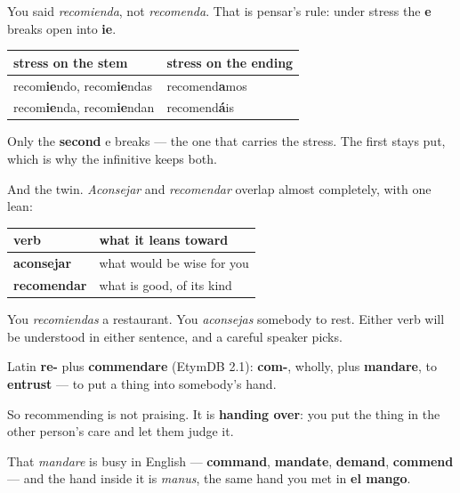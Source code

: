 \begin{grammarlens}[title={Grammar Lens: the e that breaks, and the twin it works beside}]
You said \emph{recomienda}, not \emph{recomenda}. That is pensar's rule: under stress the \textbf{e} breaks open into \textbf{ie}.

\noindent
\begin{tabularx}{\linewidth}{@{}>{\raggedright\arraybackslash}X>{\raggedright\arraybackslash}X@{}}
\toprule
\textbf{stress on the stem} & \textbf{stress on the ending} \\
\midrule
recom\textbf{ie}ndo, recom\textbf{ie}ndas & recomend\textbf{a}mos \\
recom\textbf{ie}nda, recom\textbf{ie}ndan & recomend\textbf{á}is \\
\bottomrule
\end{tabularx}

Only the \textbf{second} e breaks — the one that carries the stress. The first stays put, which is why the infinitive keeps both.

And the twin. \emph{Aconsejar} and \emph{recomendar} overlap almost completely, with one lean:

\noindent
\begin{tabularx}{\linewidth}{@{}>{\raggedright\arraybackslash}X>{\raggedright\arraybackslash}X@{}}
\toprule
\textbf{verb} & \textbf{what it leans toward} \\
\midrule
\textbf{aconsejar} & what would be wise for you \\
\textbf{recomendar} & what is good, of its kind \\
\bottomrule
\end{tabularx}

You \emph{recomiendas} a restaurant. You \emph{aconsejas} somebody to rest. Either verb will be understood in either sentence, and a careful speaker picks.
\end{grammarlens}

\begin{cousinweb}
Latin \textbf{re-} plus \textbf{commendare} (EtymDB 2.1): \textbf{com-}, wholly, plus \textbf{mandare}, to \textbf{entrust} — to put a thing into somebody's hand.

So recommending is not praising. It is \textbf{handing over}: you put the thing in the other person's care and let them judge it.

That \emph{mandare} is busy in English — \textbf{command}, \textbf{mandate}, \textbf{demand}, \textbf{commend} — and the hand inside it is \emph{manus}, the same hand you met in \textbf{el mango}.
\end{cousinweb}

